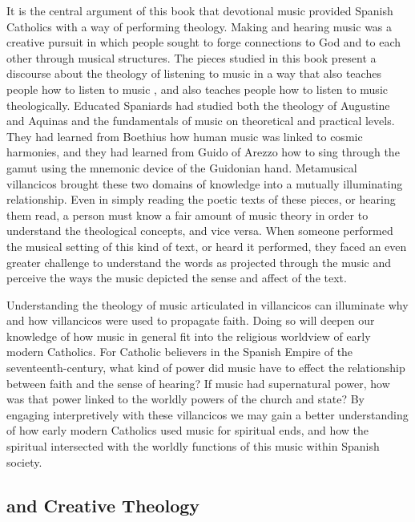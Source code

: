 It is the central argument of this book that devotional music provided Spanish
Catholics with a way of performing theology. 
Making and hearing music was a creative pursuit in which people sought to forge
connections to God and to each other through musical structures.
The pieces studied in this book present a discourse about the theology of
listening to music in a way that also teaches people how to listen to music ,
and also teaches people how to listen to music theologically.
Educated Spaniards had studied both the theology of Augustine and Aquinas and  
the fundamentals of music on theoretical and practical levels. 
They had learned from Boethius how human music was linked to cosmic harmonies,
and they had learned from Guido of Arezzo how to sing through the gamut using
the mnemonic device of the Guidonian hand.
Metamusical villancicos brought these two domains of knowledge into a mutually
illuminating relationship.
Even in simply reading the poetic texts of these pieces, or hearing them read,
a person must know a fair amount of music theory in order to understand the
theological concepts, and vice versa.
When someone performed the musical setting of this kind of text, or heard it
performed, they faced an even greater challenge to understand the words as
projected through the music and perceive the ways the music depicted the sense
and affect of the text. 

Understanding the theology of music articulated in villancicos can illuminate
why and how villancicos were used to propagate faith.  
Doing so will deepen our knowledge of how music in general fit into the
religious worldview of early modern Catholics. 
For Catholic believers in the Spanish Empire of the seventeenth-century, what
kind of power did music have to effect the relationship between faith and the
sense of hearing?
If music had supernatural power, how was that power linked to the worldly
powers of the church and state?
By engaging interpretively with these villancicos we may gain a better
understanding of how early modern Catholics used music for spiritual ends, and
how the spiritual intersected with the worldly functions of this music within
Spanish society. 


\subsection{ and Creative Theology}

